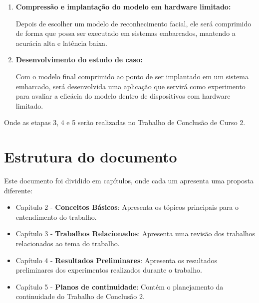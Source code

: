 \begin{enumerate}
	\item \textbf{Compressão e implantação do modelo em hardware limitado:}

		Depois de escolher um modelo de reconhecimento facial, ele será comprimido de forma que possa ser executado
		em sistemas embarcados, mantendo a acurácia alta e latência baixa.

	\item \textbf{Desenvolvimento do estudo de caso:}

		Com o modelo final comprimido ao ponto de ser implantado em um sistema embarcado, será desenvolvida uma aplicação 	 	 que servirá como experimento para avaliar a eficácia do modelo dentro de dispositivos com hardware limitado.

\end{enumerate}

Onde as etapas 3, 4 e 5 serão realizadas no Trabalho de Conclusão de Curso 2.

\section{Estrutura do documento}
Este documento foi dividido em capítulos, onde cada um apresenta uma proposta diferente:
\begin{itemize}
	\item Capítulo 2 - \textbf{Conceitos Básicos}: Apresenta os tópicos principais para o entendimento
		do trabalho.
	\item Capítulo 3 - \textbf{Trabalhos Relacionados}: Apresenta uma revisão dos trabalhos
		relacionados ao tema do trabalho.
	\item Capítulo 4 - \textbf{Resultados Preliminares}: Apresenta os resultados preliminares dos
		experimentos realizados durante o trabalho.
	\item Capítulo 5 - \textbf{Planos de continuidade}: Contém o planejamento da continuidade do
		Trabalho de Conclusão 2.
\end{itemize}
